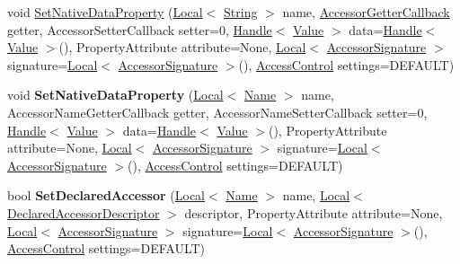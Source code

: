 \begin{DoxyCompactItemize}
\item 
void \hyperlink{classv8_1_1_template_ae186b9e472ed7604cc9693c7b9540909}{Set\+Native\+Data\+Property} (\hyperlink{classv8_1_1_local}{Local}$<$ \hyperlink{classv8_1_1_string}{String} $>$ name, \hyperlink{namespacev8_a722613c87061708a4f1aa050d095f868}{Accessor\+Getter\+Callback} getter, Accessor\+Setter\+Callback setter=0, \hyperlink{classv8_1_1_handle}{Handle}$<$ \hyperlink{classv8_1_1_value}{Value} $>$ data=\hyperlink{classv8_1_1_handle}{Handle}$<$ \hyperlink{classv8_1_1_value}{Value} $>$(), Property\+Attribute attribute=None, \hyperlink{classv8_1_1_local}{Local}$<$ \hyperlink{classv8_1_1_accessor_signature}{Accessor\+Signature} $>$ signature=\hyperlink{classv8_1_1_local}{Local}$<$ \hyperlink{classv8_1_1_accessor_signature}{Accessor\+Signature} $>$(), \hyperlink{namespacev8_a31d8355cb043d7d2dda3f4a52760b64e}{Access\+Control} settings=D\+E\+F\+A\+U\+L\+T)
\item 
\hypertarget{classv8_1_1_template_a4204e1de1646c5102549afd67f36d16b}{}void {\bfseries Set\+Native\+Data\+Property} (\hyperlink{classv8_1_1_local}{Local}$<$ \hyperlink{classv8_1_1_name}{Name} $>$ name, Accessor\+Name\+Getter\+Callback getter, Accessor\+Name\+Setter\+Callback setter=0, \hyperlink{classv8_1_1_handle}{Handle}$<$ \hyperlink{classv8_1_1_value}{Value} $>$ data=\hyperlink{classv8_1_1_handle}{Handle}$<$ \hyperlink{classv8_1_1_value}{Value} $>$(), Property\+Attribute attribute=None, \hyperlink{classv8_1_1_local}{Local}$<$ \hyperlink{classv8_1_1_accessor_signature}{Accessor\+Signature} $>$ signature=\hyperlink{classv8_1_1_local}{Local}$<$ \hyperlink{classv8_1_1_accessor_signature}{Accessor\+Signature} $>$(), \hyperlink{namespacev8_a31d8355cb043d7d2dda3f4a52760b64e}{Access\+Control} settings=D\+E\+F\+A\+U\+L\+T)\label{classv8_1_1_template_a4204e1de1646c5102549afd67f36d16b}

\item 
\hypertarget{classv8_1_1_template_aa830a5e0071ecdc34f9cc9718b9aa760}{}bool {\bfseries Set\+Declared\+Accessor} (\hyperlink{classv8_1_1_local}{Local}$<$ \hyperlink{classv8_1_1_name}{Name} $>$ name, \hyperlink{classv8_1_1_local}{Local}$<$ \hyperlink{classv8_1_1_declared_accessor_descriptor}{Declared\+Accessor\+Descriptor} $>$ descriptor, Property\+Attribute attribute=None, \hyperlink{classv8_1_1_local}{Local}$<$ \hyperlink{classv8_1_1_accessor_signature}{Accessor\+Signature} $>$ signature=\hyperlink{classv8_1_1_local}{Local}$<$ \hyperlink{classv8_1_1_accessor_signature}{Accessor\+Signature} $>$(), \hyperlink{namespacev8_a31d8355cb043d7d2dda3f4a52760b64e}{Access\+Control} settings=D\+E\+F\+A\+U\+L\+T)\label{classv8_1_1_template_aa830a5e0071ecdc34f9cc9718b9aa760}

\end{DoxyCompactItemize}
